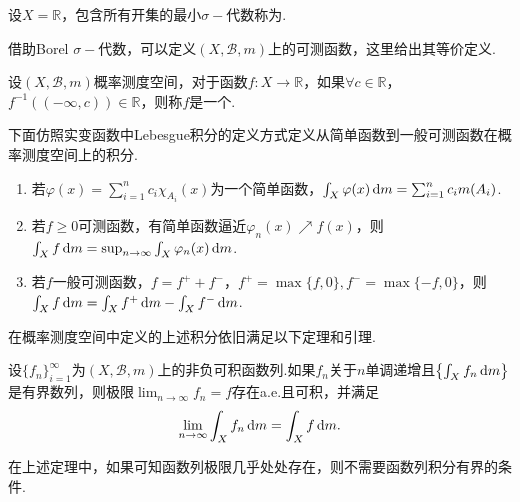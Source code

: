 \begin{definition}
    设$X=\mathbb{R}$，包含所有开集的最小$\sigma-\!\!$代数称为.
\end{definition}

借助Borel $\sigma-\!\!$代数，可以定义$(X,\mathcal{B},m)$上的可测函数，这里给出其等价定义.
\begin{definition}[可测函数]
    设$(X,\mathcal{B},m)$概率测度空间，对于函数$f:X\to\mathbb{R}$，如果$\forall c \in \mathbb{R}$，$f^{-1}\left((-\infty,c)\right) \in \mathbb{R}$，则称$f$是一个.
\end{definition}

下面仿照实变函数中Lebesgue积分的定义方式定义从简单函数到一般可测函数在概率测度空间上的积分.

\begin{definition}[积分]
    \wideline
    \begin{enumerate}
        \item 若$\varphi(x) = \sum_{i=1}^n{c_i \chi_{A_i}(x)}$为一个简单函数，$\int_X{\varphi(x)}\mathop{}\!\mathrm{d} m = \sum_{i=1}^n{c_i m(A_i)}$.
        \item 若$f\geqslant 0$可测函数，有简单函数逼近$\varphi_n(x) \nearrow f(x)$，则$\int_X{f}\mathop{}\!\mathrm{d} m=\sup_{n\to\infty}\int_X{\varphi_n(x)\mathop{}\!\mathrm{d} m}$.
        \item 若$f$一般可测函数，$f=f^++f^-$，$f^+=\max\{f,0\}, f^-=\max\{-f,0\}$，则$\int_X{f}\mathop{}\!\mathrm{d} m = \int_X{f^+}\mathop{}\!\mathrm{d} m - \int_X{f^-}\mathop{}\!\mathrm{d} m$.
    \end{enumerate}
\end{definition}

在概率测度空间中定义的上述积分依旧满足以下定理和引理.

\begin{theorem}
    设$\{f_n\}_{i=1}^\infty$为$(X,\mathcal{B},m)$上的非负可积函数列.如果$f_n$关于$n$单调递增且$\left\{ \int_X{f_n}\mathop{}\!\mathrm{d} m \right\}$是有界数列，则极限$\lim_{n\to\infty}{f_n} = f$存在a.e.且可积，并满足
    \[\lim_{n\to\infty}{\int_X{f_n}\mathop{}\!\mathrm{d} m}=\int_{X}{f}\mathop{}\!\mathrm{d} m.\]
\end{theorem}
\begin{remark}
    在上述定理中，如果可知函数列极限几乎处处存在，则不需要函数列积分有界的条件.
\end{remark}

